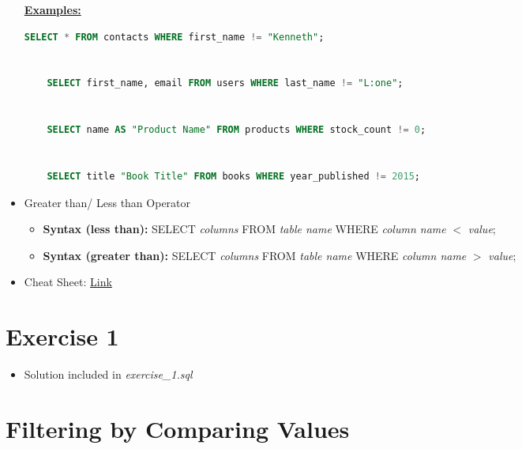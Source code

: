 \documentclass[12pt]{article}
\begin{document}
\begin{itemize}
    \bigskip

    \underline{\textbf{Examples:}}

    \bigskip

    \begin{lstlisting}[language=SQL]
    SELECT * FROM contacts WHERE first_name != "Kenneth";


    SELECT first_name, email FROM users WHERE last_name != "L:one";


    SELECT name AS "Product Name" FROM products WHERE stock_count != 0;


    SELECT title "Book Title" FROM books WHERE year_published != 2015;
    \end{lstlisting}

    \item Greater than/ Less than Operator
    \begin{itemize}
        \item \textbf{Syntax (less than):} SELECT \textit{columns} FROM \textit{table name} WHERE \textit{column name} $<$ \textit{value};
        \item \textbf{Syntax (greater than):} SELECT \textit{columns} FROM \textit{table name} WHERE \textit{column name} $>$ \textit{value};
    \end{itemize}

    \item Cheat Sheet: \href{https://github.com/treehouse/cheatsheets/blob/master/sql_basics/cheatsheet.md}{Link}
\end{itemize}

\bigskip

\section{Exercise 1}

\bigskip

\begin{itemize}
    \item Solution included in \textit{exercise\_1.sql}
\end{itemize}

\bigskip

\section{Filtering by Comparing Values}

\bigskip
\end{document}
